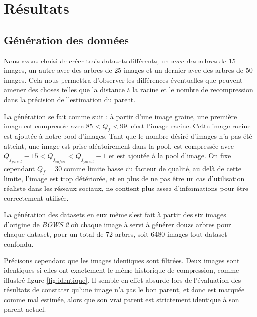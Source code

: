 \documentclass[utf8,final]{stageM2R} %
\begin{document}


\chapter{Résultats}
\label{chap4}

\section{Génération des données}
Nous avons choisi de créer trois datasets différents, un avec des arbres de 15 images, un autre avec des arbres de 25 images et un dernier avec des arbres de 50 images. Cela nous permettra d'observer les différences éventuelles que peuvent amener des choses telles que la distance à la racine et le nombre de recompression dans la précision de l'estimation du parent.

La génération se fait comme suit : à partir d'une image graine, une première image est compressée avec $85 < Q_f < 99$, c'est l'image racine. Cette image racine est ajoutée à notre pool d'images. Tant que le nombre désiré d'images n'a pas été atteint, une image est prise aléatoirement dans la pool, est compressée avec $Q_{f_{parent}} - 15 < Q_{f_{enfant}} < Q_{f_{parent}} - 1$ et est ajoutée à la pool d'image. On fixe cependant $Q_f = 30$ comme limite basse du facteur de qualité, au delà de cette limite, l'image est trop détériorée, et en plus de ne pas être un cas d'utilisation réaliste dans les réseaux sociaux, ne contient plus assez d'informations pour être correctement utilisée.

La génération des datasets en eux même s'est fait à partir des six images d'origine de \textit{BOWS 2}\autocite{bows} où chaque image à servi à générer douze arbres pour chaque dataset, pour un total de 72 arbres, soit 6480 images tout dataset confondu.

Précisons cependant que les images identiques sont filtrées. Deux images sont identiques si elles ont exactement le même historique de compression, comme illustré figure \ref{fig:identique}. Il semble en effet absurde lors de l'évaluation des résultats de constater qu'une image n'a pas le bon parent, et donc est marquée comme mal estimée, alors que son vrai parent est strictement identique à son parent actuel.


\end{document}
